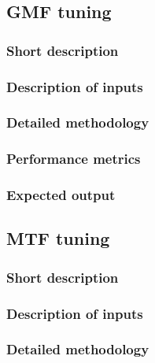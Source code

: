 \documentclass[a4paper,10pt,english]{sphinxmanual}
\begin{document}
\subsection{GMF tuning}
\label{\detokenize{alg-01-calibration:gmf-tuning}}

\subsubsection{Short description}
\label{\detokenize{alg-01-calibration:id1}}

\subsubsection{Description of inputs}
\label{\detokenize{alg-01-calibration:id2}}

\subsubsection{Detailed methodology}
\label{\detokenize{alg-01-calibration:id3}}

\subsubsection{Performance metrics}
\label{\detokenize{alg-01-calibration:id4}}

\subsubsection{Expected output}
\label{\detokenize{alg-01-calibration:id5}}

\subsection{MTF tuning}
\label{\detokenize{alg-01-calibration:mtf-tuning}}

\subsubsection{Short description}
\label{\detokenize{alg-01-calibration:id6}}

\subsubsection{Description of inputs}
\label{\detokenize{alg-01-calibration:id7}}

\subsubsection{Detailed methodology}
\label{\detokenize{alg-01-calibration:id8}}
\end{document}
